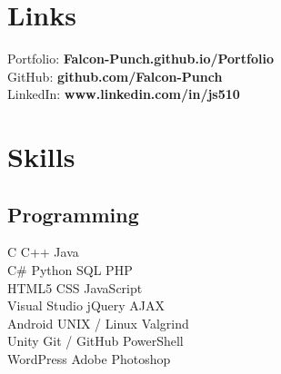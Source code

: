 \documentclass[letterpaper]{deedy-resume} %
\newcommand{\CS}{C\#}
\begin{document}
\begin{minipage}[t]{0.33\textwidth}
\sectionspace %




\section{Links} 

Portfolio: {\bf Falcon-Punch.github.io/Portfolio}\\
GitHub: {\bf github.com/Falcon-Punch}\\
LinkedIn: {\bf www.linkedin.com/in/js510}

\sectionspace %


\section{Skills}

\subsection{Programming}
\vspace{1.5mm}
C \textbullet{} C++ \textbullet{} Java \\
\vspace{1.5mm}
\CS{} \textbullet{} Python \textbullet{} SQL \textbullet{} PHP \\
HTML5 \textbullet{} CSS \textbullet{} JavaScript \\
\vspace{1.5mm}
Visual Studio \textbullet{} jQuery \textbullet{} AJAX \\
Android \textbullet{} UNIX / Linux \textbullet{} Valgrind \\
Unity \textbullet{} Git / GitHub \textbullet{} PowerShell \\
WordPress \textbullet{} Adobe Photoshop

\sectionspace %




\end{minipage}
\end{document}
